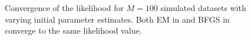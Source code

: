 \begin{figure}[htbp]%
    \centering%
    \caption{Convergence of the likelihood for $M=100$ simulated datasets
    with varying initial parameter estimates. 
    Both EM in  and BFGS
    in  converge to the same
    likelihood value.}\label{fig:ballistic_lh}
\end{figure}
    

